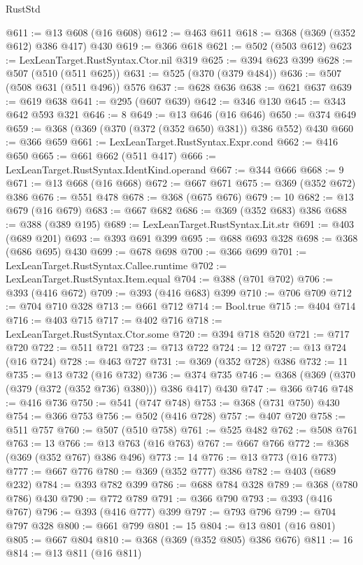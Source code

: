 \begin{lexlean}{RustStd}
\begin{coremodule}
@611 := @13 @608 (@16 @608)
@612 := @463 @611
@618 := @368 (@369 (@352 @612) @386 @417) @430
@619 := @366 @618
@621 := @502 (@503 @612)
@623 := LexLeanTarget.RustSyntax.Ctor.nil @319
@625 := @394 @623 @399
@628 := @507 (@510 (@511 @625))
@631 := @525 (@370 (@379 @484))
@636 := @507 (@508 @631 (@511 @496)) @576
@637 := @628 @636
@638 := @621 @637
@639 := @619 @638
@641 := @295 (@607 @639)
@642 := @346 @130
@645 := @343 @642 @593 @321
@646 := 8
@649 := @13 @646 (@16 @646)
@650 := @374 @649
@659 := @368 (@369 (@370 (@372 (@352 @650) @381)) @386 @552) @430
@660 := @366 @659
@661 := LexLeanTarget.RustSyntax.Expr.cond
@662 := @416 @650
@665 := @661 @662 (@511 @417)
@666 := LexLeanTarget.RustSyntax.IdentKind.operand
@667 := @344 @666
@668 := 9
@671 := @13 @668 (@16 @668)
@672 := @667 @671
@675 := @369 (@352 @672) @386
@676 := @551 @478
@678 := @368 (@675 @676)
@679 := 10
@682 := @13 @679 (@16 @679)
@683 := @667 @682
@686 := @369 (@352 @683) @386
@688 := @388 (@389 @195)
@689 := LexLeanTarget.RustSyntax.Lit.str
@691 := @403 (@689 @201)
@693 := @393 @691 @399
@695 := @688 @693 @328
@698 := @368 (@686 @695) @430
@699 := @678 @698
@700 := @366 @699
@701 := LexLeanTarget.RustSyntax.Callee.runtime
@702 := LexLeanTarget.RustSyntax.Item.equal
@704 := @388 (@701 @702)
@706 := @393 (@416 @672)
@709 := @393 (@416 @683) @399
@710 := @706 @709
@712 := @704 @710 @328
@713 := @661 @712
@714 := Bool.true
@715 := @404 @714
@716 := @403 @715
@717 := @402 @716
@718 := LexLeanTarget.RustSyntax.Ctor.some
@720 := @394 @718 @520
@721 := @717 @720
@722 := @511 @721
@723 := @713 @722
@724 := 12
@727 := @13 @724 (@16 @724)
@728 := @463 @727
@731 := @369 (@352 @728) @386
@732 := 11
@735 := @13 @732 (@16 @732)
@736 := @374 @735
@746 := @368 (@369 (@370 (@379 (@372 (@352 @736) @380))) @386 @417) @430
@747 := @366 @746
@748 := @416 @736
@750 := @541 (@747 @748)
@753 := @368 (@731 @750) @430
@754 := @366 @753
@756 := @502 (@416 @728)
@757 := @407 @720
@758 := @511 @757
@760 := @507 (@510 @758)
@761 := @525 @482
@762 := @508 @761
@763 := 13
@766 := @13 @763 (@16 @763)
@767 := @667 @766
@772 := @368 (@369 (@352 @767) @386 @496)
@773 := 14
@776 := @13 @773 (@16 @773)
@777 := @667 @776
@780 := @369 (@352 @777) @386
@782 := @403 (@689 @232)
@784 := @393 @782 @399
@786 := @688 @784 @328
@789 := @368 (@780 @786) @430
@790 := @772 @789
@791 := @366 @790
@793 := @393 (@416 @767)
@796 := @393 (@416 @777) @399
@797 := @793 @796
@799 := @704 @797 @328
@800 := @661 @799
@801 := 15
@804 := @13 @801 (@16 @801)
@805 := @667 @804
@810 := @368 (@369 (@352 @805) @386 @676)
@811 := 16
@814 := @13 @811 (@16 @811)

\end{coremodule}
\end{lexlean}
